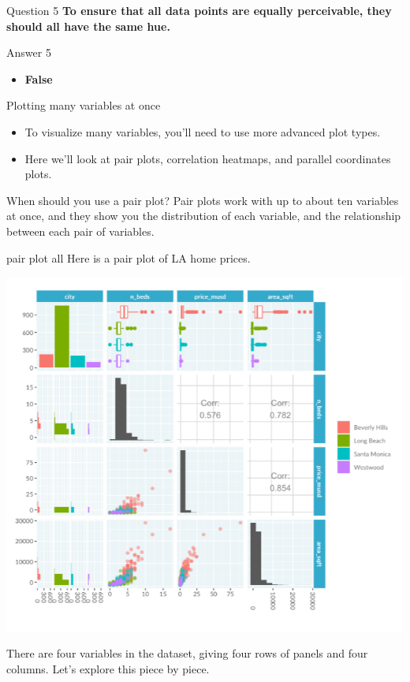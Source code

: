 \documentclass[
  ignorenonframetext,
]{beamer}
\providecommand{\tightlist}{%
  \setlength{\itemsep}{0pt}\setlength{\parskip}{0pt}}
\begin{document}
\begin{frame}{Question 5}
\label{question-5}
\textbf{To ensure that all data points are equally perceivable, they
should all have the same hue.}
\end{frame}

\begin{frame}{Answer 5}
\label{answer-5}
\begin{itemize}
\tightlist
\item
  \textbf{False}
\end{itemize}
\end{frame}

\begin{frame}{Plotting many variables at once}
\label{plotting-many-variables-at-once}
\begin{itemize}
\item
  To visualize many variables, you'll need to use more advanced plot
  types.
\item
  Here we'll look at pair plots, correlation heatmaps, and parallel
  coordinates plots.
\end{itemize}
\end{frame}

\begin{frame}{When should you use a pair plot?}
\label{when-should-you-use-a-pair-plot}
Pair plots work with up to about ten variables at once, and they show
you the distribution of each variable, and the relationship between each
pair of variables.
\end{frame}

\begin{frame}{pair plot all}
\label{pair-plot-all}
Here is a pair plot of LA home prices.

\includegraphics{../images/im89.png}

There are four variables in the dataset, giving four rows of panels and
four columns. Let's explore this piece by piece.
\end{frame}
\end{document}
